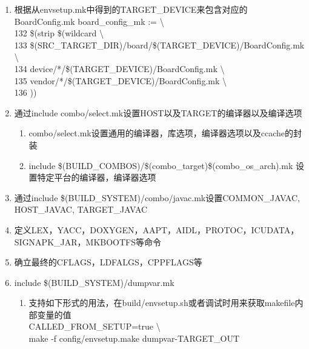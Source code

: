 \documentclass[a4paper,11pt]{article}
\begin{document}
\begin{CJK*}{UTF8}{gbsn}
    \begin{enumerate} 
        \item 根据从envsetup.mk中得到的TARGET\_DEVICE来包含对应的BoardConfig.mk  board\_config\_mk := \textbackslash \\
            132     \$(strip \$(wildcard \textbackslash \\
            133         \$(SRC\_TARGET\_DIR)/board/\$(TARGET\_DEVICE)/BoardConfig.mk \textbackslash \\
            134         device/*/\$(TARGET\_DEVICE)/BoardConfig.mk \textbackslash \\
            135         vendor/*/\$(TARGET\_DEVICE)/BoardConfig.mk \textbackslash \\
            136     )) \\
        \item 通过include combo/select.mk设置HOST以及TARGET的编译器以及编译选项 \newline
        \begin{enumerate} 
            \item combo/select.mk设置通用的编译器，库选项，编译器选项以及ccache的封装\newline
            \item include \$(BUILD\_COMBOS)/\$(combo\_target)\$(combo\_os\_arch).mk 设置特定平台的编译器，编译器选项 \newline
        \end{enumerate} 
        \item 通过include \$(BUILD\_SYSTEM)/combo/javac.mk设置COMMON\_JAVAC, HOST\_JAVAC, TARGET\_JAVAC \\
        \item 定义LEX，YACC，DOXYGEN，AAPT，AIDL，PROTOC，ICUDATA，SIGNAPK\_JAR，MKBOOTFS等命令 \\
        \item 确立最终的CFLAGS，LDFALGS，CPPFLAGS等 \\
        \item include \$(BUILD\_SYSTEM)/dumpvar.mk \\
        \begin{enumerate} 
            \item 支持如下形式的用法，在build/envsetup.sh或者调试时用来获取makefile内部变量的值 \\ 
              CALLED\_FROM\_SETUP=true \textbackslash \\
                make -f config/envsetup.make dumpvar-TARGET\_OUT \\

\end{enumerate}
\end{enumerate}
\end{CJK*}
\end{document}
